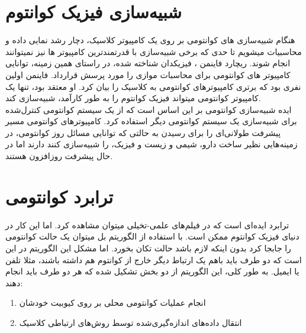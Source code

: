 \section{شبیه‌سازی فیزیک کوانتوم}
هنگام شبیه‌سازی های کوانتومی بر روی یک کامپیوتر کلاسیک، دچار رشد نمایی داده و محاسبیات میشویم تا حدی که برخی شبیه‌سازی با قدرتمندترین کامپیوتر ها نیز نمیتوانند انجام شوند.  ریچارد فاینمن
، فیزیکدان شناخته شده، در راستای همین زمینه، توانایی کامپیوتر های کوانتومی برای محاسبات موازی را مورد پرسش قرارداد. فاینمن اولین نفری بود که برتری کامپیوترهای کوانتومی به کلاسیک را بیان کرد. او معتقد بود، تنها یک کامپیوتر کوانتومی میتواند فیزیک کوانتوم را به طور کارآمد، شبیه‌سازی کند. 
\\
ایده شبیه‌سازی کوانتومی بر این اساس است که از یک سیستم کوانتومی کنترل‌شده برای شبیه‌سازی یک سیستم کوانتومی دیگر استفاده کرد. کامپیوتر‌های کوانتومی مسیر پیشرفت طولانی‌ای را برای رسیدن به حالتی که توانایی مسائل روز کوانتومی، در زمینه‌هایی نظیر ساخت دارو، شیمی و زیست و فیزیک، را شبیه‌سازی کنند دارند اما در حال پیشرفت روزافزون هستند.
\cite{quantuminfo}
\section{ترابرد کوانتومی}
ترابرد
ایده‌ای است که در فیلم‌های علمی-تخیلی میتوان مشاهده کرد. اما این کار در دنیای فیزیک کوانتوم ممکن است. با استفاده از الگوریتم بل
میتوان یک حالت کوانتومی را جابجا کرد بدون اینکه لازم باشد حالت تکان بخورد. اما مشکل این الگوریتم در این است که دو طرف باید باهم یک ارتباط دیگر خارج از کوانتوم هم داشته باشند، مثلا تلفن یا ایمیل. به طور کلی، این الگوریتم از دو بخش تشکیل شده که هر دو طرف باید انجام دهند:
\begin{enumerate}
\item
انجام عملیات کوانتومی محلی
 بر روی کیوبیت خودشان

\item
انتقال داده‌های اندازه‌گیری‌شده توسط روش‌های ارتباطی کلاسیک
\end{enumerate}
\cite{singhbook}

